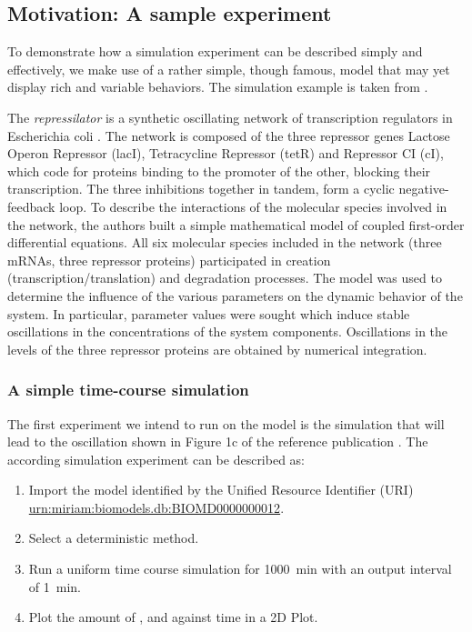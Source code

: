 \subsection{Motivation: A sample experiment}
\label{motivation:example}
To demonstrate how a simulation experiment can be described simply and effectively, we make use of a rather simple, though famous, model that may yet display rich and variable behaviors. The simulation example is taken from \citep{Waltemath:2010}. 

 The \emph{repressilator} is a synthetic oscillating network of transcription regulators in Escherichia coli \citep{Elowitz:2000}.
  The network is composed of the three repressor genes Lactose Operon Repressor (lacI), Tetracycline Repressor (tetR) and Repressor CI (cI), which code for proteins binding to the promoter of the other, blocking their transcription. The three inhibitions together in tandem, form a cyclic negative-feedback loop. 
 To describe the interactions of the molecular species involved in the network, the authors built a simple mathematical model of coupled first-order differential equations. All six molecular species included in the network (three mRNAs, three repressor proteins) participated in creation (transcription/translation) and degradation processes. The model was used to determine the influence of the various parameters on the dynamic behavior of the system. In particular, parameter values were sought which induce stable oscillations in the concentrations of the system components. Oscillations in the levels of the three repressor proteins are obtained by numerical integration. 

\subsubsection{A simple time-course simulation}
 \label{sec:intro1}
 The first experiment we intend to run on the model is the simulation that will lead to the oscillation shown in Figure 1c of the reference publication \citep{Elowitz:2000}. The according simulation experiment can be described as:

\begin{enumerate}
 	\item{Import the model identified by the Unified Resource Identifier (URI) \citep{Berners-Lee:2005} \url{urn:miriam:biomodels.db:BIOMD0000000012}.}
 	\item {Select a deterministic method.}
 	\item{Run a uniform time course simulation for 1000~min with an output interval of 1~min.}
 	\item{Plot the amount of ,  and  against time in a 2D Plot.}
 \end{enumerate}

